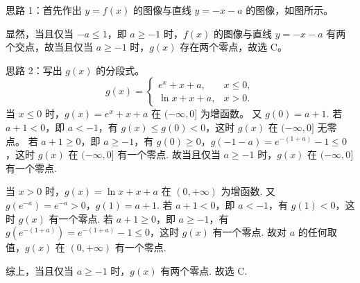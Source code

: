 \begin{solutions}
思路 1：首先作出 $ y=f(x) $ 的图像与直线 $ y=-x-a $ 的图像，如图所示。  

显然，当且仅当 $ -a\leqslant 1 $，即 $ a\geqslant -1 $ 时，$ f(x) $ 的图像与直线 $ y=-x-a $ 有两个交点，故当且仅当 $ a\geqslant -1 $ 时，$ g(x) $ 存在两个零点，故选 C。

思路 2：写出 $ g(x) $ 的分段式。  
$$
g(x)=\begin{cases}
e^x+x+a, & x\leqslant 0, \\
\ln x+x+a, & x>0.
\end{cases}
$$  
当 $ x\leqslant 0 $ 时，$ g(x)=e^x+x+a $ 在 $ (-\infty,0] $ 为增函数。  
又 $ g(0)=a+1 $.  
若 $ a+1<0 $，即 $ a<-1 $，有 $ g(x)\leqslant g(0)<0 $，这时 $ g(x) $ 在 $ (-\infty,0] $ 无零点。  
若 $ a+1\geqslant 0 $，即 $ a\geqslant -1 $，有 $ g(0)\geqslant 0 $，$ g(-1-a)=e^{-(1+a)}-1\leqslant 0 $，这时 $ g(x) $ 在 $ (-\infty,0] $ 有一个零点.  
故当且仅当 $ a\geqslant -1 $ 时，$ g(x) $ 在 $ (-\infty,0] $ 有一个零点.  

当 $ x>0 $ 时，$ g(x)=\ln x+x+a $ 在 $ (0,+\infty) $ 为增函数.  
又 $ g(e^{-a})=e^{-a}>0 $，$ g(1)=a+1 $.  
若 $ a+1<0 $，即 $ a<-1 $，有 $ g(1)<0 $，这时 $ g(x) $ 有一个零点.  
若 $ a+1\geqslant 0 $，即 $ a\geqslant -1 $，有 $ g(e^{-(1+a)})=e^{-(1+a)}-1\leqslant 0 $，这时 $ g(x) $ 有一个零点.  
故对 $ a $ 的任何取值，$ g(x) $ 在 $ (0,+\infty) $ 有一个零点.  

综上，当且仅当 $ a\geqslant -1 $ 时，$ g(x) $ 有两个零点. 故选 C.
\end{solutions}